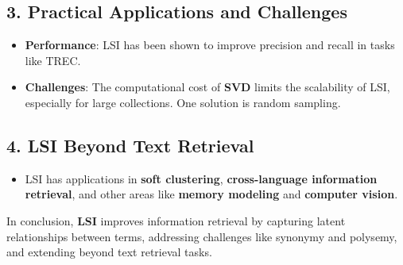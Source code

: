 \documentclass{article}
\begin{document}
\subsection*{3. Practical Applications and Challenges}
\begin{itemize}
    \item \textbf{Performance}: LSI has been shown to improve precision and recall in tasks like TREC.
    \item \textbf{Challenges}: The computational cost of \textbf{SVD} limits the scalability of LSI, especially for large collections. One solution is random sampling.
\end{itemize}

\subsection*{4. LSI Beyond Text Retrieval}
\begin{itemize}
    \item LSI has applications in \textbf{soft clustering}, \textbf{cross-language information retrieval}, and other areas like \textbf{memory modeling} and \textbf{computer vision}.
\end{itemize}

In conclusion, \textbf{LSI} improves information retrieval by capturing latent relationships between terms, addressing challenges like synonymy and polysemy, and extending beyond text retrieval tasks.
\end{document}
